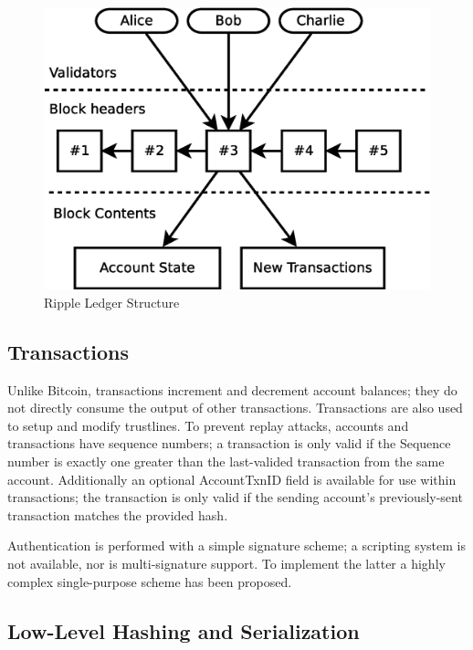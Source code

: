 \documentclass{article}
\begin{document}
\begin{figure}
    \centering
    \includegraphics[scale=0.3]{figures/ledger-blockchain.eps}
    \caption{Ripple Ledger Structure}
    \label{fig:ledger-blockchain}
\end{figure}


\subsection{Transactions}

Unlike Bitcoin, transactions increment and decrement account balances; they do
not directly consume the output of other transactions. Transactions are also
used to setup and modify trustlines. To prevent replay attacks, accounts and
transactions have sequence numbers; a transaction is only valid if the Sequence
number is exactly one greater than the last-valided transaction from the same
account. Additionally an optional AccountTxnID field is available for use
within transactions; the transaction is only valid if the sending account's
previously-sent transaction matches the provided hash.

Authentication is performed with a simple signature scheme; a scripting system
is not available, nor is multi-signature support. To implement the latter a
highly complex single-purpose scheme\cite{ripple-wiki-multisign} has been
proposed.


\subsection{Low-Level Hashing and Serialization}
\end{document}
